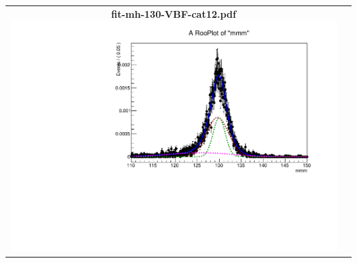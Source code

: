 \begin{longtable}{|c|c|}
{}
 \\
\hline
\parbox{0.49\textwidth}{
\centering
{\bfseries fit-mh-130-VBF-cat12.pdf}
\includegraphics[width=.49\textwidth]{figures/signal_model/AppendixBdt/VBF/130/fit_mh_130_VBF_cat12.pdf}
}
 & \\ \hline
\end{longtable}
